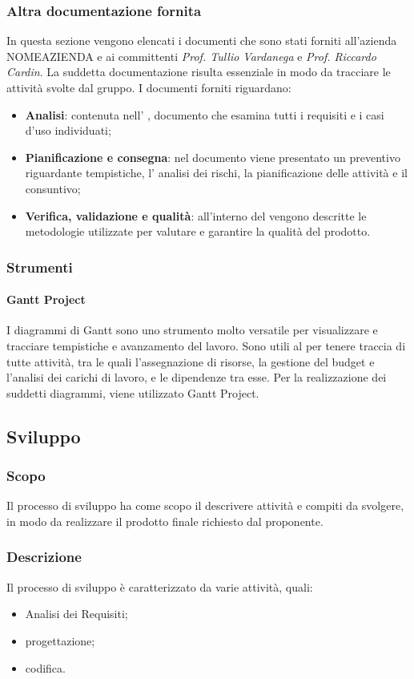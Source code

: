 \subsubsection{Altra documentazione fornita}
In questa sezione vengono elencati i documenti che sono stati forniti all'azienda NOMEAZIENDA e ai committenti \textit{Prof. Tullio Vardanega} e \textit{Prof. Riccardo Cardin}. La suddetta documentazione risulta essenziale in modo da tracciare le attività  svolte dal gruppo.
I documenti forniti riguardano: 
\begin{itemize}
	\item \textbf{Analisi}: contenuta nell' \AdR{}, documento che esamina tutti i requisiti e i casi d'uso individuati;
	\item \textbf{Pianificazione e consegna}: nel documento \PdP{} viene presentato un preventivo riguardante tempistiche, l' analisi dei rischi, la pianificazione delle attività e il consuntivo;
	\item \textbf{Verifica, validazione e qualità}: all'interno del \PdQ{} vengono descritte le metodologie utilizzate per valutare e garantire la qualità del prodotto.
\end{itemize}
\subsubsection{Strumenti}
\paragraph{Gantt Project}
I diagrammi di Gantt sono uno strumento molto versatile per visualizzare e tracciare tempistiche e avanzamento del lavoro.  Sono utili al \RdP{} per tenere traccia di tutte attività, tra le quali l'assegnazione di risorse,  la gestione del budget e l'analisi dei carichi di lavoro, e le dipendenze tra esse. Per la realizzazione dei suddetti diagrammi, viene utilizzato Gantt Project.
\subsection{Sviluppo}
\subsubsection{Scopo}
Il processo di sviluppo ha come scopo il descrivere attività e compiti da svolgere, in modo da realizzare il prodotto finale richiesto dal proponente.
\subsubsection{Descrizione}
Il processo di sviluppo è caratterizzato da varie attività,  quali:
\begin{itemize}
	\item Analisi dei Requisiti;
	\item progettazione;
	\item codifica.
\end{itemize}
